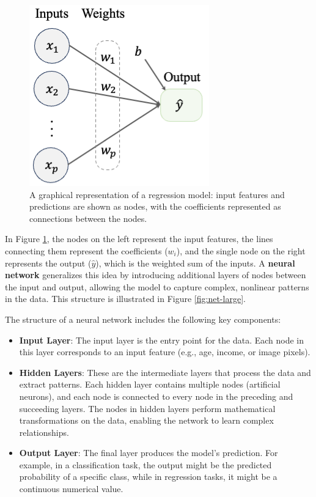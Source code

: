 \documentclass[
]{book}
\providecommand{\tightlist}{%
  \setlength{\itemsep}{0pt}\setlength{\parskip}{0pt}}
\theoremstyle{definition}
\theoremstyle{definition}
\theoremstyle{definition}
\theoremstyle{definition}
\theoremstyle{remark}
\begin{document}
\begin{figure}

{\centering \includegraphics[width=0.4\linewidth]{images/net_reg} 

}

\caption{A graphical representation of a regression model: input features and predictions are shown as nodes, with the coefficients represented as connections between the nodes.}\label{fig:net-reg}
\end{figure}

In Figure \ref{fig:net-reg}, the nodes on the left represent the input features, the lines connecting them represent the coefficients (\(w_i\)), and the single node on the right represents the output (\(\hat{y}\)), which is the weighted sum of the inputs. A \textbf{neural network} generalizes this idea by introducing additional layers of nodes between the input and output, allowing the model to capture complex, nonlinear patterns in the data. This structure is illustrated in Figure \ref{fig:net-large}.

The structure of a neural network includes the following key components:

\begin{itemize}
\tightlist
\item
  \textbf{Input Layer}: The input layer is the entry point for the data. Each node in this layer corresponds to an input feature (e.g., age, income, or image pixels).\\
\item
  \textbf{Hidden Layers}: These are the intermediate layers that process the data and extract patterns. Each hidden layer contains multiple nodes (artificial neurons), and each node is connected to every node in the preceding and succeeding layers. The nodes in hidden layers perform mathematical transformations on the data, enabling the network to learn complex relationships.\\
\item
  \textbf{Output Layer}: The final layer produces the model's prediction. For example, in a classification task, the output might be the predicted probability of a specific class, while in regression tasks, it might be a continuous numerical value.
\end{itemize}
\end{document}
